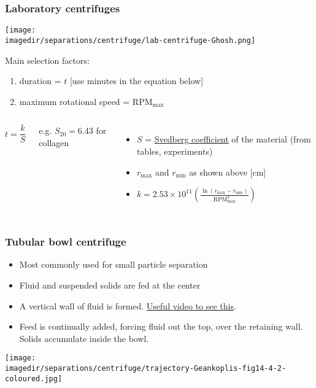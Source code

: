\begin{frame}\frametitle{Laboratory centrifuges}

	\begin{center}
		\texttt{[image: \\imagedir/separations/centrifuge/lab-centrifuge-Ghosh.png]}
	\end{center}
	\vspace{-12pt}
	Main selection factors:
	\begin{enumerate}
		\item	duration = $t$ [use minutes in the equation below]
		\item	maximum rotational speed = $\text{RPM}_\text{max}$ 	%
	\end{enumerate}
	\vspace{-12pt}
	\begin{columns}[t]
			\[
				t = \displaystyle \frac{k}{S}
			\]

			\vspace{24pt}
			{\small e.g. $S_{20} = 6.43$ for collagen}
			\begin{itemize}
				\item	$S$ = \href{http://en.wikipedia.org/wiki/Svedberg}{Svedberg coefficient} of the material (from tables, experiments)
				\item	$r_\text{max}$ and $r_\text{min}$ as shown above [cm]
				\item	$k = 2.53 \times 10^{11} \left(\displaystyle \frac{\ln\left( r_\text{max} -r_\text{min} \right)}{\text{RPM}_\text{max}^2} \right)$
			\end{itemize}
	\end{columns}
\end{frame}

\begin{frame}\frametitle{Tubular bowl centrifuge}
	\begin{itemize}
		\item	Most commonly used for small particle separation
		\item	Fluid and suspended solids are fed at the center
		\item	A vertical wall of fluid is formed. \href{http://www.youtube.com/watch?v=cUhgKFV5Ri4}{Useful video to see this}.
		\item	Feed is continually added, forcing fluid out the top, over the retaining wall. Solids accumulate inside the bowl.
	\end{itemize}
	\begin{center}
		\texttt{[image: \\imagedir/separations/centrifuge/trajectory-Geankoplis-fig14-4-2-coloured.jpg]}
	\end{center}
	\vspace{-24pt}	
\end{frame}

